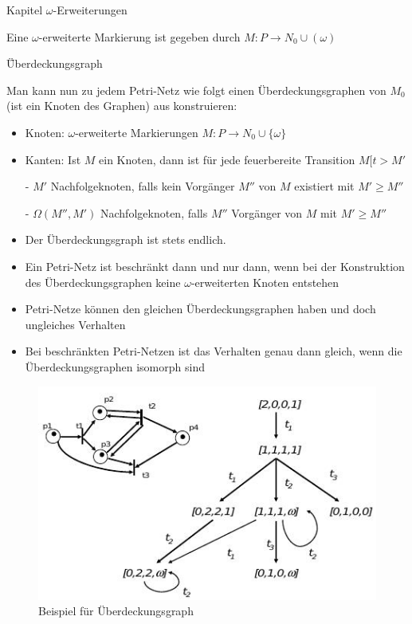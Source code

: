 \begin{chapter}{Kapitel}
\f{$\omega$-Erweiterungen}
\vspace*{4pt}

\noindent Eine $\omega$-erweiterte Markierung ist gegeben durch $M:P \rightarrow N_0 \cup (\omega)$
\vspace*{6pt}

\f{Überdeckungsgraph}
\vspace*{4pt}

\noindent Man kann nun zu jedem Petri-Netz wie folgt einen Überdeckungsgraphen von $M_0$ (ist ein Knoten des Graphen) aus konstruieren:
\begin{itemize}
 \item Knoten: $\omega$-erweiterte Markierungen $M:P\rightarrow N_0 \cup \{\omega \}$
 \item Kanten: Ist $M$ ein Knoten, dann ist für jede feuerbereite Transition $M[t>M'$ 
 
 \qquad \qquad  - $M'$ Nachfolgeknoten, falls kein Vorgänger $M''$ von $M$ existiert mit $M'\geq M''$
 
 \qquad \qquad  - $\Omega(M'',M')$ Nachfolgeknoten, falls $M''$ Vorgänger von $M$ mit $M'\geq M''$
\end{itemize}
\begin{itemize}
 \item Der Überdeckungsgraph ist stets endlich.
 \item Ein Petri-Netz ist beschränkt dann und nur dann, wenn bei der Konstruktion des Überdeckungsgraphen keine $\omega$-erweiterten Knoten entstehen
 \item Petri-Netze können den gleichen Überdeckungsgraphen haben und doch ungleiches Verhalten
 \item Bei beschränkten Petri-Netzen ist das Verhalten genau dann gleich, wenn die Überdeckungsgraphen isomorph sind
\end{itemize}

\begin{figure}[!ht]
 \centering
 \includegraphics[scale=0.85]{pics/ueberdeckungsgraph}
 \caption{Beispiel für Überdeckungsgraph}
\end{figure}


\end{chapter}

